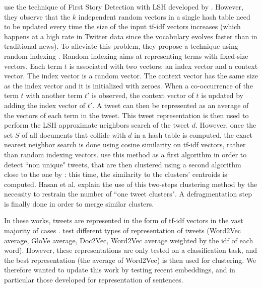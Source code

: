 \citet{hasan_twitternews_2016} use the technique of First Story Detection with LSH developed by \citet{petrovic_streaming_2010}. However, they observe that the $k$ independent random vectors in a single hash table need to be updated every time the size of the input tf-idf vectors increases (which happens at a high rate in Twitter data since the vocabulary evolves faster than in traditional news). To alleviate this problem, they propose a technique using random indexing \citep{sahlgren_introduction_2005}. Random indexing  aims at representing terms with fixed-size vectors. Each term $t$ is associated with two vectors: an index vector and a context vector. The index vector is a random vector. The context vector has the same size as the index vector and it is initialized with zeroes. When a co-occurrence of the term $t$ with another term $t'$ is observed, the context vector of $t$ is updated by adding the index vector of $t'$. A tweet can then be represented as an average of the vectors of each term in the tweet. This tweet representation is then used to perform the LSH approximate neighbors search of the tweet $d$. However, once the set $S$ of all documents that collide with $d$ in a hash table is computed, the exact nearest neighbor search is done using cosine similarity on tf-idf vectors, rather than random indexing vectors. \citet{hasan_twitternews_2016} use this method as a first algorithm in order to detect ``non unique" tweets, that are then clustered using a second algorithm close to the one by \citet{sankaranarayanan_twitterstand:_2009}: this time, the similarity to the clusters' centroids is computed. Hasan et al. explain the use of this two-steps clustering method by the necessity to restrain the number of ``one tweet clusters". A defragmentation step is finally done in order to merge similar clusters.


In these works, tweets are represented in the form of tf-idf vectors in the vast majority of cases \citep{sankaranarayanan_twitterstand:_2009, petrovic_streaming_2010, becker_automatic_2011, hasan_twitternews_2016}. \citet{repp_extracting_2018} test different types of representation of tweets (Word2Vec average, GloVe average, Doc2Vec, Word2Vec average weighted by the idf of each word). However, these representations are only tested on a classification task, and the best representation (the average of Word2Vec) is then used for clustering. We therefore wanted to update this work by testing recent embeddings, and in particular those developed for representation of sentences.

